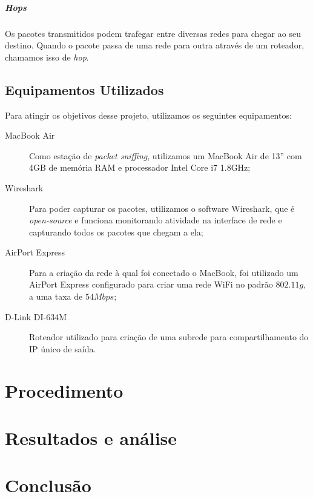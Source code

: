 \documentclass[12pt,a4paper]{report}
\begin{document}
\paragraph{\textit{Hops}} Os pacotes transmitidos podem trafegar entre diversas redes para chegar ao seu destino. Quando o pacote passa de uma rede para outra através de um roteador, chamamos isso de \textit{hop}.

\section{Equipamentos Utilizados}

Para atingir os objetivos desse projeto, utilizamos os seguintes equipamentos:

\begin{description}
\item[MacBook Air] Como estação de \textit{packet sniffing}, utilizamos um MacBook Air de 13'' com 4GB de memória RAM e processador Intel Core i7 1.8GHz;
\item[Wireshark] Para poder capturar os pacotes, utilizamos o software Wireshark, que é \textit{open-source} e funciona monitorando atividade na interface de rede e capturando todos os pacotes que chegam a ela;
\item[AirPort Express] Para a criação da rede à qual foi conectado o MacBook, foi utilizado um AirPort Express configurado para criar uma rede WiFi no padrão \(802.11g\), a uma taxa de \(54Mbps\);
\item[D-Link DI-634M] Roteador utilizado para criação de uma subrede para compartilhamento do IP único de saída.
\end{description}


\chapter{Procedimento}

\chapter{Resultados e análise}

\chapter{Conclusão}
\end{document}
